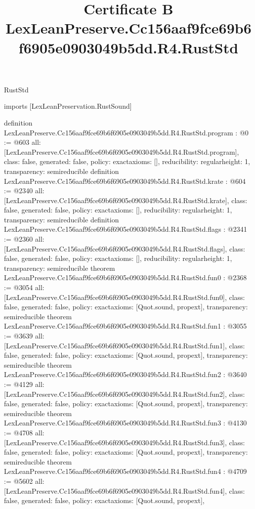 \begin{lexlean}{RustStd}
\title{Certificate B LexLeanPreserve.Cc156aaf9fce69b6f6905e0903049b5dd.R4.RustStd}
\begin{coremodule}
imports [LexLeanPreservation.RustSound]

definition LexLeanPreserve.Cc156aaf9fce69b6f6905e0903049b5dd.R4.RustStd.program : @0 := @603 {
  all: [LexLeanPreserve.Cc156aaf9fce69b6f6905e0903049b5dd.R4.RustStd.program],
  class: false,
  generated: false,
  policy: exact{axioms: []},
  reducibility: regular{height: 1},
  transparency: semireducible
}
definition LexLeanPreserve.Cc156aaf9fce69b6f6905e0903049b5dd.R4.RustStd.krate : @604 := @2340 {
  all: [LexLeanPreserve.Cc156aaf9fce69b6f6905e0903049b5dd.R4.RustStd.krate],
  class: false,
  generated: false,
  policy: exact{axioms: []},
  reducibility: regular{height: 1},
  transparency: semireducible
}
definition LexLeanPreserve.Cc156aaf9fce69b6f6905e0903049b5dd.R4.RustStd.flags : @2341 := @2360 {
  all: [LexLeanPreserve.Cc156aaf9fce69b6f6905e0903049b5dd.R4.RustStd.flags],
  class: false,
  generated: false,
  policy: exact{axioms: []},
  reducibility: regular{height: 1},
  transparency: semireducible
}
theorem LexLeanPreserve.Cc156aaf9fce69b6f6905e0903049b5dd.R4.RustStd.fun0 : @2368 := @3054 {
  all: [LexLeanPreserve.Cc156aaf9fce69b6f6905e0903049b5dd.R4.RustStd.fun0],
  class: false,
  generated: false,
  policy: exact{axioms: [Quot.sound, propext]},
  transparency: semireducible
}
theorem LexLeanPreserve.Cc156aaf9fce69b6f6905e0903049b5dd.R4.RustStd.fun1 : @3055 := @3639 {
  all: [LexLeanPreserve.Cc156aaf9fce69b6f6905e0903049b5dd.R4.RustStd.fun1],
  class: false,
  generated: false,
  policy: exact{axioms: [Quot.sound, propext]},
  transparency: semireducible
}
theorem LexLeanPreserve.Cc156aaf9fce69b6f6905e0903049b5dd.R4.RustStd.fun2 : @3640 := @4129 {
  all: [LexLeanPreserve.Cc156aaf9fce69b6f6905e0903049b5dd.R4.RustStd.fun2],
  class: false,
  generated: false,
  policy: exact{axioms: [Quot.sound, propext]},
  transparency: semireducible
}
theorem LexLeanPreserve.Cc156aaf9fce69b6f6905e0903049b5dd.R4.RustStd.fun3 : @4130 := @4708 {
  all: [LexLeanPreserve.Cc156aaf9fce69b6f6905e0903049b5dd.R4.RustStd.fun3],
  class: false,
  generated: false,
  policy: exact{axioms: [Quot.sound, propext]},
  transparency: semireducible
}
theorem LexLeanPreserve.Cc156aaf9fce69b6f6905e0903049b5dd.R4.RustStd.fun4 : @4709 := @5602 {
  all: [LexLeanPreserve.Cc156aaf9fce69b6f6905e0903049b5dd.R4.RustStd.fun4],
  class: false,
  generated: false,
  policy: exact{axioms: [Quot.sound, propext]},
}
\end{coremodule}
\end{lexlean}
